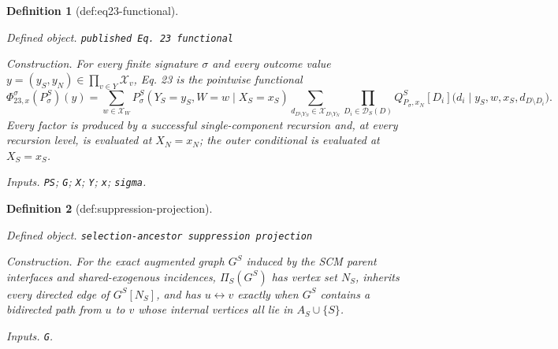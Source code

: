 \documentclass{article}
\newtheorem{definition}{Definition}
\begin{document}
\begin{definition}[def:eq23-functional]\label{def:eq23-functional}
\par\smallskip\noindent\emph{Defined object.} \texttt{published Eq. 23 functional}
\par\smallskip\noindent\emph{Construction.} For every finite signature \(\sigma\) and every outcome value \(y=(y_S,y_N)\in\prod_{v\in Y}\mathcal X_v\), Eq. 23 is the pointwise functional \[\Phi_{23,x}^{\sigma}(P_\sigma^S)(y)=\sum_{w\in\mathcal X_W} P_\sigma^S(Y_S=y_S,W=w\mid X_S=x_S)\sum_{d_{D\setminus Y_N}\in\mathcal X_{D\setminus Y_N}}\prod_{D_i\in\mathcal D_S(D)}Q_{P_\sigma,x_N}^S[D_i]\bigl(d_i\mid y_S,w,x_S,d_{D\setminus D_i}\bigr).\] Every factor is produced by a successful single-component recursion and, at every recursion level, is evaluated at \(X_N=x_N\); the outer conditional is evaluated at \(X_S=x_S\).
\par\smallskip\noindent\emph{Inputs.} \texttt{PS}; \texttt{G}; \texttt{X}; \texttt{Y}; \texttt{x}; \texttt{sigma}.
\end{definition}

\begin{definition}[def:suppression-projection]\label{def:suppression-projection}
\par\smallskip\noindent\emph{Defined object.} \texttt{selection-\allowbreak{}ancestor suppression projection}
\par\smallskip\noindent\emph{Construction.} For the exact augmented graph \(G^S\) induced by the SCM parent interfaces and shared-exogenous incidences, \(\Pi_S(G^S)\) has vertex set \(N_S\), inherits every directed edge of \(G^S[N_S]\), and has \(u\leftrightarrow v\) exactly when \(G^S\) contains a bidirected path from \(u\) to \(v\) whose internal vertices all lie in \(A_S\cup\{S\}\).
\par\smallskip\noindent\emph{Inputs.} \texttt{G}.
\end{definition}
\end{document}
